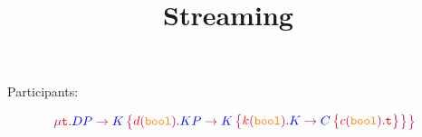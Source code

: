 \documentclass{article}
\title{Streaming~\cite{SchneierApplied2015}}
\date{}
\begin{document}
	\maketitle

	Participants:


	$$
	\gtRec{t}{
	\gtComm{DP}{K}{
		{{d}[bool]{
				\gtComm{KP}{K}{
					{{k}[bool]{
							\gtComm{K}{C}{
								{{c}[bool]{\gtVar{t}}}
							}
					}}
				}
		}}
	}
	}
	$$

	
	
\end{document}
